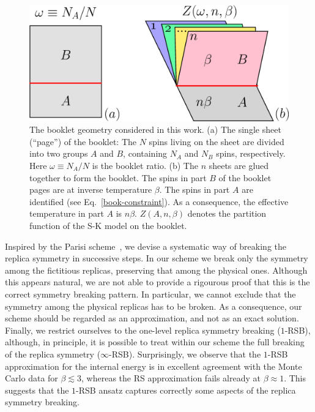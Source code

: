 \documentclass[twocolumn,superscriptaddress,prb,10pt]{revtex4-1}
\begin{document}
\begin{figure}[t]
\includegraphics*[width=0.93\linewidth]{./draft_figs/cartoon}
\caption{ The booklet geometry considered in this work. (a) The single sheet 
 (``page'') of the booklet: The $N$ spins living on the sheet are divided into 
 two groups $A$ and $B$, containing $N_A$ and $N_B$ spins, respectively. Here 
 $\omega\equiv N_A/N$ is the booklet ratio. (b) The $n$ sheets are glued together 
 to form the booklet. The spins in part $B$ of the booklet pages are at inverse 
 temperature $\beta$. The spins in part $A$ are identified  (see Eq.~\eqref{book-constraint}). 
 As a consequence, the effective temperature in part $A$ is $n\beta$. 
 $Z(A,n,\beta)$ denotes the partition function of the S-K model on 
 the booklet. 
}
\label{cartoon}
\end{figure}

Inspired by the Parisi scheme~\cite{parisi-1979}, we devise a systematic way of breaking 
the replica symmetry in successive steps. In our scheme we break only the symmetry among 
the fictitious replicas, preserving that among the physical ones. Although this appears 
natural, we are not able to provide a rigourous proof that this is the correct symmetry 
breaking pattern. In particular, we cannot exclude that the symmetry among the physical 
replicas has to be broken. As a consequence, our scheme should be regarded as an 
approximation, and not as an exact solution. Finally, we restrict ourselves to the 
one-level replica symmetry breaking ($1$-RSB), although, in principle, it is possible 
to treat within our scheme the full breaking of the replica symmetry ($\infty$-RSB). 
Surprisingly, we observe that the $1$-RSB approximation for the internal energy is in 
excellent agreement with the Monte Carlo data for  $\beta\lesssim 3$, whereas the RS 
approximation fails already at $\beta\approx 1$. This suggests that the $1$-RSB ansatz 
captures correctly some aspects of the replica symmetry breaking. 
\end{document}
